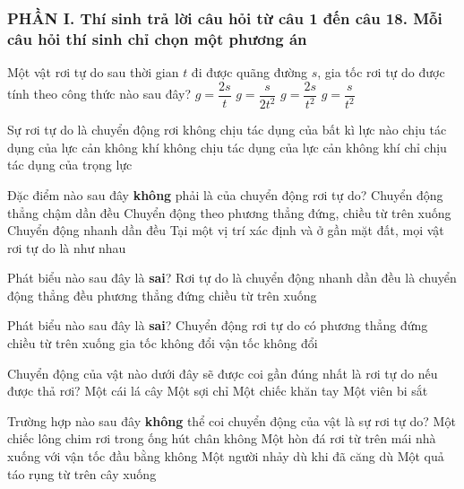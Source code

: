 \subsubsection*{PHẦN I. Thí sinh trả lời câu hỏi từ câu 1 đến câu 18. Mỗi câu hỏi thí sinh chỉ chọn một phương án}
\setcounter{ex}{0}
\begin{ex}%
Một vật rơi tự do sau thời gian $t$ đi được quãng đường $s$, gia tốc rơi tự do được tính theo công thức nào sau đây?
\choice
{$g=\dfrac{2 s}{t}$}
{$g=\dfrac{s}{2 t^2}$}
{\True $g=\dfrac{2 s}{t^2}$}
{$g=\dfrac{s}{t^2}$}

\loigiai{
}
 \end{ex}
\begin{ex}%
Sự rơi tự do là chuyển động rơi
\choice
{không chịu tác dụng của bất kì lực nào}
{chịu tác dụng của lực cản không khí}
{không chịu tác dụng của lực cản không khí}
{\True chỉ chịu tác dụng của trọng lực}

\loigiai{
}
 \end{ex}
\begin{ex}%
Đặc điểm nào sau đây \textbf{không} phải là của chuyển động rơi tự do?
\choice
{\True Chuyển động thẳng chậm dần đều}
{Chuyển động theo phương thẳng đứng, chiều từ trên xuống}
{Chuyển động nhanh dần đều}
{Tại một vị trí xác định và ở gần mặt đất, mọi vật rơi tự do là như nhau}
\loigiai{
}
 \end{ex}
\begin{ex}%
Phát biểu nào sau đây là \textbf{sai}?  Rơi tự do
\choice
{là chuyển động nhanh dần đều}
{\True là chuyển động thẳng đều}
{phương thẳng đứng}
{chiều từ trên xuống}

\loigiai{
}
 \end{ex}
\begin{ex}%
Phát biểu nào sau đây là \textbf{sai}? Chuyển động rơi tự do có
\choice
{phương thẳng đứng}
{chiều từ trên xuống}
{gia tốc không đổi}
{\True vận tốc không đổi}
\loigiai{
}
 \end{ex}
\begin{ex}%
Chuyển động của vật nào dưới đây sẽ được coi gần đúng nhất là rơi tự do nếu được thả rơi?
\choice
{Một cái lá cây}
{Một sợi chỉ}
{Một chiếc khăn tay}
{\True Một viên bi sắt}
 \end{ex}
\begin{ex}%
Trường hợp nào sau đây \textbf{không} thể coi chuyển động của vật là sự rơi tự do?
\choice
{Một chiếc lông chim rơi trong ống hút chân không}
{Một hòn đá rơi từ trên mái nhà xuống với vận tốc đầu bằng không}
{\True Một người nhảy dù khi đã căng dù}
{Một quả táo rụng từ trên cây xuống}
 \end{ex}

